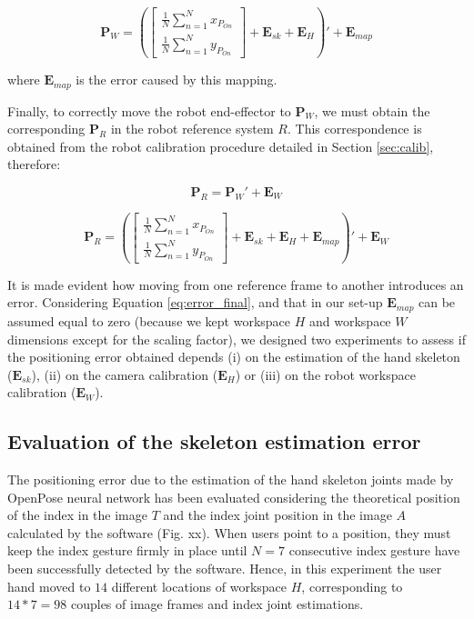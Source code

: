 \documentclass[letterpaper, 10 pt, conference]{ieeeconf}  %
\begin{document}
\begin{equation}
\mathbf{P}_W = \left(\begin{bmatrix}
\frac{1}{N}\sum_{n=1}^{N}x_{P_{On}} \\
\frac{1}{N}\sum_{n=1}^{N}y_{P_{On}}
\end{bmatrix} + \mathbf{E}_{sk} + \mathbf{E}_{H}\right)' + \mathbf{E}_{map}
\end{equation}

where $\mathbf{E}_{map}$ is the error caused by this mapping.

Finally, to correctly move the robot end-effector to $\mathbf{P}_W$, we must obtain the corresponding $\mathbf{P}_R$ in the robot reference system $R$. This correspondence is obtained from the robot calibration procedure detailed in Section \ref{sec:calib}, therefore: 

\begin{equation}
\mathbf{P}_R = \mathbf{P}_W' + \mathbf{E}_W
\end{equation}

\begin{equation}\label{eq:error_final}
\mathbf{P}_R = \left(\begin{bmatrix}
\frac{1}{N}\sum_{n=1}^{N}x_{P_{On}} \\
\frac{1}{N}\sum_{n=1}^{N}y_{P_{On}}
\end{bmatrix} + \mathbf{E}_{sk} + \mathbf{E}_{H} + \mathbf{E}_{map} \right)' + \mathbf{E}_W
\end{equation}

It is made evident how moving from one reference frame to another introduces an error. Considering Equation \ref{eq:error_final}, and that in our set-up $\mathbf{E}_{map}$ can be assumed equal to zero (because we kept workspace $H$ and workspace $W$ dimensions except for the scaling factor), we designed two experiments to assess if the positioning error obtained depends (i) on the estimation of the hand skeleton ($\mathbf{E}_{sk}$), (ii) on the camera calibration ($\mathbf{E}_{H}$) or (iii) on the robot workspace calibration ($\mathbf{E}_{W}$).

\subsection{Evaluation of the skeleton estimation error}
The positioning error due to the estimation of the hand skeleton joints made by OpenPose neural network has been evaluated considering the theoretical position of the index in the image $T$ and the index joint position in the image $A$ calculated by the software (Fig. xx). %
When users point to a position, they must keep the index gesture firmly in place until $N = 7$ consecutive index gesture have been successfully detected by the software. Hence, in this experiment the user hand moved to $14$ different locations of workspace $H$, corresponding to $14 * 7 = 98$ couples of image frames and index joint estimations.
\end{document}
